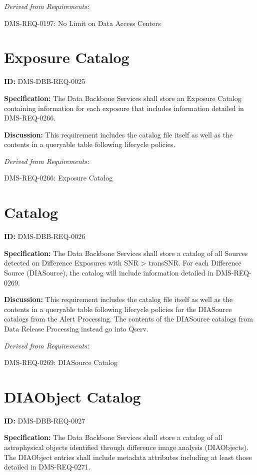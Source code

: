 \documentclass[SE,toc,lsstdraft]{lsstdoc}
\begin{document}
\emph{Derived from Requirements:}

DMS-REQ-0197:
No Limit on Data Access Centers \newline

\section{Exposure Catalog}

\label{DMS-DBB-REQ-0025}
\textbf{ID:} DMS-DBB-REQ-0025

\textbf{Specification:}
The Data Backbone Services shall store an Exposure Catalog containing information for each exposure that includes information detailed in DMS-REQ-0266.

\textbf{Discussion:}
This requirement includes the catalog file itself as well as the contents in a queryable table following lifecycle policies.

\emph{Derived from Requirements:}

DMS-REQ-0266:
Exposure Catalog \newline

\section{Catalog}

\label{DMS-DBB-REQ-0026}
\textbf{ID:} DMS-DBB-REQ-0026

\textbf{Specification:}
The Data Backbone Services shall store a catalog of all Sources detected on Difference Exposures with SNR > transSNR.   For each Difference Source (DIASource), the catalog will include information detailed in DMS-REQ-0269.

\textbf{Discussion:}
This requirement includes the catalog file itself as well as the contents in a queryable table following lifecycle policies for the DIASource catalogs from the Alert Processing.  The contents of the DIASource catalogs from Data Release Processing instead go into Qserv.

\emph{Derived from Requirements:}

DMS-REQ-0269:
DIASource Catalog \newline

\section{DIAObject Catalog}

\label{DMS-DBB-REQ-0027}
\textbf{ID:} DMS-DBB-REQ-0027

\textbf{Specification:}
The Data Backbone Services shall store a catalog of all astrophysical objects identified through difference image analysis (DIAObjects). The DIAObject entries shall include metadata attributes including at least those detailed in DMS-REQ-0271.
\end{document}
